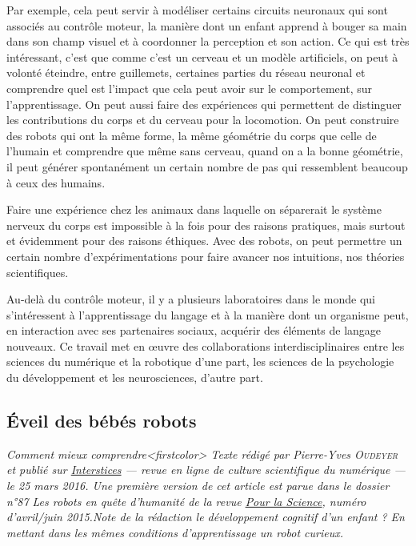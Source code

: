 Par exemple, cela peut servir à modéliser certains circuits neuronaux qui sont associés au contrôle moteur, la manière dont un enfant apprend à bouger sa main dans son champ visuel et à coordonner la perception et son action. Ce qui est très intéressant, c'est que comme c'est un cerveau et un modèle artificiels, on peut à volonté éteindre, entre guillemets, certaines parties du réseau neuronal et comprendre quel est l'impact que cela peut avoir sur le comportement, sur l'apprentissage. On peut aussi faire des expériences qui permettent de distinguer les contributions du corps et du cerveau pour la locomotion. On peut construire des robots qui ont la même forme, la même géométrie du corps que celle de l'humain et comprendre que même sans cerveau, quand on a la bonne géométrie, il peut générer spontanément un certain nombre de pas qui ressemblent beaucoup à ceux des humains. 

Faire une expérience chez les animaux dans laquelle on séparerait le système nerveux du corps est impossible à la fois pour des raisons pratiques, mais surtout et évidemment pour des raisons éthiques. Avec des robots, on peut permettre un certain nombre d'expérimentations pour faire avancer nos intuitions, nos théories scientifiques. 

Au-delà du contrôle moteur, il y a plusieurs laboratoires dans le monde qui s'intéressent à l'apprentissage du langage et à la manière dont un organisme peut, en interaction avec ses partenaires sociaux, acquérir des éléments de langage nouveaux. Ce travail met en œuvre des collaborations interdisciplinaires entre les sciences du numérique et la robotique d'une part, les sciences de la psychologie du développement et les neurosciences, d'autre part. 



\subsection[Éveil des bébés robots]{Éveil des bébés robots}
\label{sub:III.2.3}

\begingroup\itshape
Comment mieux comprendre\caution[t]<firstcolor>{%
\upshape Texte rédigé par Pierre-Yves \textsc{Oudeyer} et publié sur \href{https://interstices.info/leveil-des-bebes-robots/}{Interstices} --- revue en ligne de culture scientifique du numérique --- le 25 mars 2016. Une première version de cet article est parue dans le dossier n°87 Les robots en quête d’humanité de la revue \href{https://www.pourlascience.fr/index.php}{Pour la Science}, numéro d’avril/juin 2015.}{\upshape Note de la rédaction}
 le développement cognitif d’un enfant ? En mettant dans les mêmes conditions d’apprentissage un robot curieux.
\endgroup

